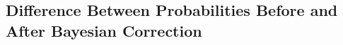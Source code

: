 \documentclass[a4paper]{article}
\begin{document}
\subsection{Difference Between Probabilities Before and After Bayesian Correction}\label{bayes_correction}

\end{document}
